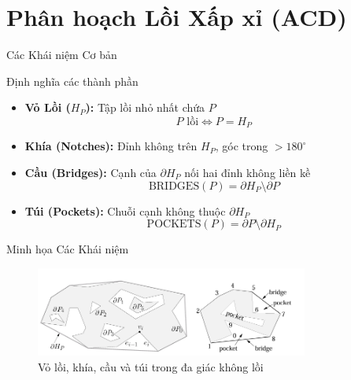 \documentclass[aspectratio=169]{beamer}
\begin{document}
\section{Phân hoạch Lồi Xấp xỉ (ACD)}

\begin{frame}{Các Khái niệm Cơ bản}

    \begin{block}{Định nghĩa các thành phần}
        \begin{itemize}
            \item \textbf{Vỏ Lồi ($H_P$):} Tập lồi nhỏ nhất chứa $P$
                  \[
                      P \text{ lồi} \Leftrightarrow P = H_P
                  \]

            \item \textbf{Khía (Notches):} Đỉnh không trên $H_P$, góc trong $> 180^\circ$

            \item \textbf{Cầu (Bridges):} Cạnh của $\partial H_P$ nối hai đỉnh không liền kề
                  \[
                      \text{BRIDGES}(P) = \partial H_P \setminus \partial P
                  \]

            \item \textbf{Túi (Pockets):} Chuỗi cạnh không thuộc $\partial H_P$
                  \[
                      \text{POCKETS}(P) = \partial P \setminus \partial H_P
                  \]
        \end{itemize}
    \end{block}

\end{frame}

\begin{frame}{Minh họa Các Khái niệm}
    \begin{figure}
        \centering
        \includegraphics[width=0.8\textwidth]{imgs/ACD-5.png}
        \caption{\small Vỏ lồi, khía, cầu và túi trong đa giác không lồi}
    \end{figure}
\end{frame}
\end{document}
